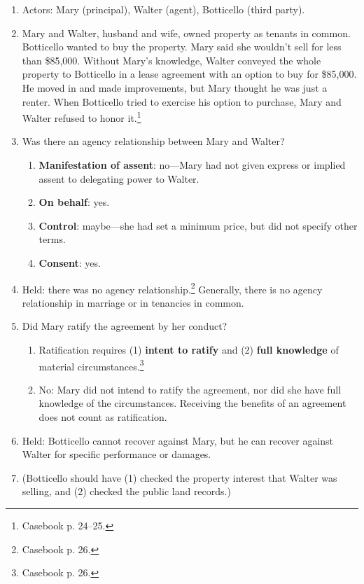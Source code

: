 \begin{enumerate}
    \item Actors: Mary (principal), Walter (agent), Botticello (third party).
    \item Mary and Walter, husband and wife, owned property as tenants in 
    common. Botticello wanted to buy the property. Mary said she wouldn't sell 
    for less than \$85,000. Without Mary's knowledge, Walter conveyed the 
    whole property to Botticello in a lease agreement with an option to buy 
    for \$85,000. He moved in and made improvements, but Mary thought he was 
    just a renter. When Botticello tried to exercise his option to purchase, 
    Mary and Walter refused to honor it.\footnote{Casebook p. 24--25.}
    \item Was there an agency relationship between Mary and Walter?
    \begin{enumerate}
        \item \textbf{Manifestation of assent}: no---Mary had not given 
        express or implied assent to delegating power to Walter.
        \item \textbf{On behalf}: yes.
        \item \textbf{Control}: maybe---she had set a minimum price, but did 
        not specify other terms.
        \item \textbf{Consent}: yes.
    \end{enumerate}
    \item Held: there was no agency relationship.\footnote{Casebook p. 26.} 
    Generally, there is no agency relationship in marriage or in tenancies in 
    common.
    \item Did Mary ratify the agreement by her conduct?
    \begin{enumerate}
        \item Ratification requires (1) \textbf{intent to ratify} and (2) 
        \textbf{full knowledge} of material circumstances.\footnote{Casebook 
        p. 26.}
        \item No: Mary did not intend to ratify the agreement, nor did she 
        have full knowledge of the circumstances. Receiving the benefits of an 
        agreement does not count as ratification.
    \end{enumerate}
    \item Held: Botticello cannot recover against Mary, but he can recover 
    against Walter for specific performance or damages.
    \item (Botticello should have (1) checked the property interest that 
    Walter was selling, and (2) checked the public land records.)
\end{enumerate}

